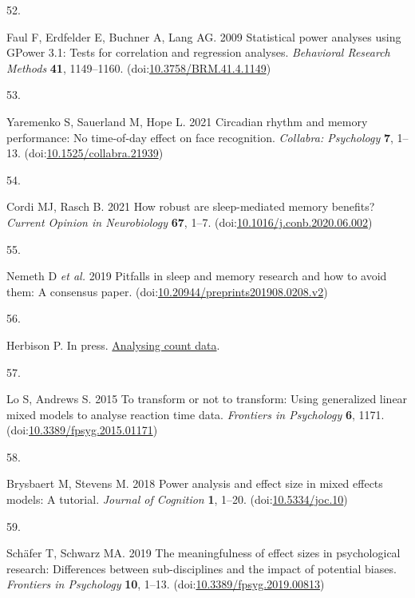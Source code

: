 \documentclass[
]{article}
\newlength{\cslhangindent}
\newlength{\csllabelwidth}
\newlength{\cslentryspacingunit} %
\newenvironment{CSLReferences}[2] %
 {%
  \setlength{\parindent}{0pt}
  \ifodd #1
  \let\oldpar\par
  \def\par{\hangindent=\cslhangindent\oldpar}
  \fi
  \setlength{\parskip}{#2\cslentryspacingunit}
 }%
 {}
\newcommand{\CSLLeftMargin}[1]{\parbox[t]{\csllabelwidth}{#1}}
\newcommand{\CSLRightInline}[1]{\parbox[t]{\linewidth - \csllabelwidth}{#1}\break}
\begin{document}
\begin{CSLReferences}{0}{0}
\leavevmode{}%
\CSLLeftMargin{52. }%
\CSLRightInline{Faul F, Erdfelder E, Buchner A, Lang AG. 2009 Statistical power analyses using GPower 3.1: Tests for correlation and regression analyses. \emph{Behavioral Research Methods} \textbf{41}, 1149--1160. (doi:\href{https://doi.org/10.3758/BRM.41.4.1149}{10.3758/BRM.41.4.1149})}

\leavevmode{}%
\CSLLeftMargin{53. }%
\CSLRightInline{Yaremenko S, Sauerland M, Hope L. 2021 Circadian rhythm and memory performance: No time-of-day effect on face recognition. \emph{Collabra: Psychology} \textbf{7}, 1--13. (doi:\href{https://doi.org/10.1525/collabra.21939}{10.1525/collabra.21939})}

\leavevmode{}%
\CSLLeftMargin{54. }%
\CSLRightInline{Cordi MJ, Rasch B. 2021 How robust are sleep-mediated memory benefits? \emph{Current Opinion in Neurobiology} \textbf{67}, 1--7. (doi:\href{https://doi.org/10.1016/j.conb.2020.06.002}{10.1016/j.conb.2020.06.002})}

\leavevmode{}%
\CSLLeftMargin{55. }%
\CSLRightInline{Nemeth D \emph{et al.} 2019 Pitfalls in sleep and memory research and how to avoid them: A consensus paper. (doi:\href{https://doi.org/10.20944/preprints201908.0208.v2}{10.20944/preprints201908.0208.v2})}

\leavevmode{}%
\CSLLeftMargin{56. }%
\CSLRightInline{Herbison P. In press. \href{https://www.ics.org/Abstracts/Publish/44/000161.pdf}{Analysing count data}. }

\leavevmode{}%
\CSLLeftMargin{57. }%
\CSLRightInline{Lo S, Andrews S. 2015 To transform or not to transform: Using generalized linear mixed models to analyse reaction time data. \emph{Frontiers in Psychology} \textbf{6}, 1171. (doi:\href{https://doi.org/10.3389/fpsyg.2015.01171}{10.3389/fpsyg.2015.01171})}

\leavevmode{}%
\CSLLeftMargin{58. }%
\CSLRightInline{Brysbaert M, Stevens M. 2018 Power analysis and effect size in mixed effects models: A tutorial. \emph{Journal of Cognition} \textbf{1}, 1--20. (doi:\href{https://doi.org/10.5334/joc.10}{10.5334/joc.10})}

\leavevmode{}%
\CSLLeftMargin{59. }%
\CSLRightInline{Schäfer T, Schwarz MA. 2019 The meaningfulness of effect sizes in psychological research: Differences between sub-disciplines and the impact of potential biases. \emph{Frontiers in Psychology} \textbf{10}, 1--13. (doi:\href{https://doi.org/10.3389/fpsyg.2019.00813}{10.3389/fpsyg.2019.00813})}


\end{CSLReferences}
\end{document}
